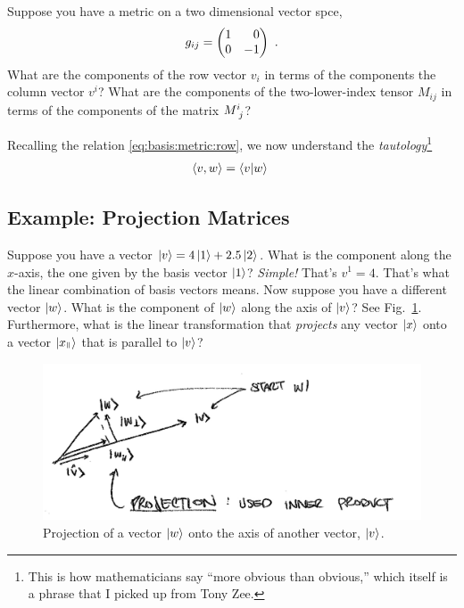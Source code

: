 \documentclass[12pt]{article}
\begin{document}
\begin{exercise}
Suppose you have a metric on a two dimensional vector spce,
\begin{align}
    g_{ij}=
    \begin{pmatrix}
        1 & \pp 0\\
        0 & -1
    \end{pmatrix} \ .
\end{align}
What are the components of the row vector $v_i$ in terms of the components the column vector $v^i$? What are the components of the two-lower-index tensor $M_{ij}$ in terms of the components of the matrix $M\aij{i}{j}$?
\end{exercise}

Recalling the relation \eqref{eq:basis:metric:row}, we now understand the \emph{tautology}\footnote{This is how mathematicians say ``more obvious than obvious,'' which itself is a phrase that I picked up from Tony Zee.}
\begin{align}
    \la v, w \ra = \la v | w \ra \ 
    \label{eq:inner:product:row:vector}
\end{align}







\subsection{Example: Projection Matrices}
\label{sec:projections}
Suppose you have a vector $\left|v\right\rangle =  4\left|1\right\rangle+2.5\left|2\right\rangle$. What is the component along the $x$-axis, the one given by the basis vector $\left|1\right\rangle$? \emph{Simple!} That's $v^1 = 4$. That's what the linear combination of basis vectors means.
% 
Now suppose you have a different vector $\left|w\right\rangle$. What is the component of $\left|w\right\rangle$ along the axis of $\left|v\right\rangle$? See Fig.~\ref{fig:gram:projection}. Furthermore, what is the linear transformation that \emph{projects} any vector $\left|x\right\rangle$ onto a vector $\ket{x_\paral}$ that is parallel to $\left|v\right\rangle$?  

\begin{figure}[tb]
    \centering
    \includegraphics[width=.8\textwidth]{figures/gram-projection.jpg}
    \caption{Projection of a vector $\left|w\right\rangle$ onto the axis of another vector, $\left|v\right\rangle$.}
    \label{fig:gram:projection}
\end{figure}
\end{document}
